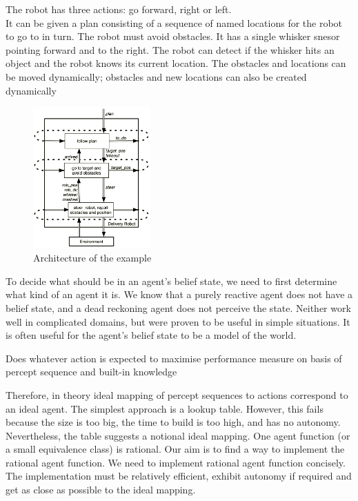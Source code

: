 \documentclass[a4paper]{article}
\theoremstyle{plain}
\theoremstyle{definition}
\newtheorem{defn}{Definition}[section]
\newtheorem{exmp}{Example}[section]
\theoremstyle{remark}
\begin{document}
\begin{tcolorbox}[colback=black!3!white,colframe=black!60!white,title=\begin{exmp}Delivery Robot \label{Delivery Robot}\end{exmp}]
        The robot has three actions: go forward, right or left.\\
	It can be given a plan consisting of a sequence of named locations for the robot to go to in turn. The robot must avoid obstacles. It has a single whisker snesor pointing forward and to the right. The robot can detect if the whisker hits an object and the robot knows its current location. The obstacles and locations can be moved dynamically; obstacles and new locations can also be created dynamically
	\begin{figure}[H]
		\centering
		\includegraphics[width=0.4\textwidth]{3.png}
		\caption{Architecture of the example}
		\label{fig:3-png}
	\end{figure}
\end{tcolorbox}
To decide what should be in an agent's belief state, we need to first determine what kind of an agent it is. We know that a purely reactive agent does not have a belief state, and a dead reckoning agent does not perceive the state. Neither work well in complicated domains, but were proven to be useful in simple situations. It is often useful for the agent's belief state to be a model of the world. \\
\begin{tcolorbox}[colback=black!3!white,colframe=black!60!white,title=\begin{defn}Ideal Rational Agent \label{Ideal Rational Agent}\end{defn}]
Does whatever action is expected to maximise performance measure on basis of percept sequence and built-in knowledge
\end{tcolorbox}
Therefore, in theory ideal mapping of percept sequences to actions correspond to an ideal agent. The simplest approach is a lookup table. However, this fails because the size is too big, the time to build is too high, and has no autonomy. Nevertheless, the table suggests a notional ideal mapping. One agent function (or a small equivalence class) is rational. Our aim is to find a way to implement the rational agent function. We need to implement rational agent function concisely. The implementation must be relatively efficient, exhibit autonomy if required and get as close as possible to the ideal mapping. 
\end{document}
